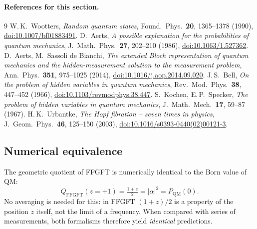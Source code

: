 \paragraph{References for this section.}
\begingroup\renewcommand{\chapter}[2]{}\small\raggedright
\begin{thebibliography}{9}
 W.\,K.~Wootters, \emph{Random quantum states},
  Found.\ Phys.\ \textbf{20}, 1365--1378 (1990),
  \href{https://doi.org/10.1007/bf01883491}{doi:10.1007/bf01883491}.
 D.~Aerts, \emph{A possible explanation for the
  probabilities of quantum mechanics}, J.\ Math.\ Phys.\ \textbf{27},
  202--210 (1986),
  \href{https://doi.org/10.1063/1.527362}{doi:10.1063/1.527362}.
 D.~Aerts, M.~Sassoli de Bianchi, \emph{The
  extended Bloch representation of quantum mechanics and the
  hidden-measurement solution to the measurement problem}, Ann.\ Phys.\
  \textbf{351}, 975--1025 (2014),
  \href{https://doi.org/10.1016/j.aop.2014.09.020}{doi:10.1016/j.aop.2014.09.020}.
\bibitem{bell1966} J.\,S.~Bell, \emph{On the problem of hidden
  variables in quantum mechanics}, Rev.\ Mod.\ Phys.\ \textbf{38},
  447--452 (1966),
  \href{https://doi.org/10.1103/revmodphys.38.447}{doi:10.1103/revmodphys.38.447}.
\bibitem{kochen1967} S.~Kochen, E.\,P.~Specker, \emph{The problem of
  hidden variables in quantum mechanics}, J.\ Math.\ Mech.\ \textbf{17},
  59--87 (1967).
 H.\,K.~Urbantke, \emph{The Hopf fibration --
  seven times in physics}, J.\ Geom.\ Phys.\ \textbf{46}, 125--150
  (2003),
  \href{https://doi.org/10.1016/s0393-0440(02)00121-3}{doi:10.1016/s0393-0440(02)00121-3}.
\end{thebibliography}\endgroup

\subsection{Numerical equivalence}

The geometric quotient of FFGFT is numerically identical to the Born
value of QM:
\begin{equation}
  Q_\text{FFGFT}(z = +1) = \tfrac{1+z}{2} = |\alpha|^2 = P_\text{QM}(0).
\end{equation}
No averaging is needed for this: in FFGFT $(1+z)/2$ is a property of
the position $z$ itself, not the limit of a frequency. When compared
with series of measurements, both formalisms therefore yield
\emph{identical} predictions.

